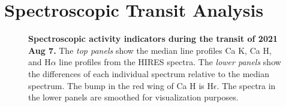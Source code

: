 \documentclass[12pt,modern,twocolumn,tighten]{aastex63}
\begin{document}
%  
%  






\section{Spectroscopic Transit Analysis}
\label{app:rm}

\begin{figure}[tp]
	\begin{center}
		\leavevmode
	\end{center}
	\vspace{-0.5cm}
	\caption{
    {\bf Spectroscopic activity indicators during the transit of 2021
    Aug 7.} The {\it top panels} show the median line profiles Ca K,
    Ca H, and H$\alpha$ line profiles from the HIRES spectra.  The
    {\it lower panels} show the differences of each individual
    spectrum relative to the median spectrum.  The bump in the red
    wing of Ca H is H$\epsilon$.
    The spectra in the lower panels are smoothed for visualization
    purposes.
    \label{fig:rvactivity}
	}
\end{figure}
\end{document}
